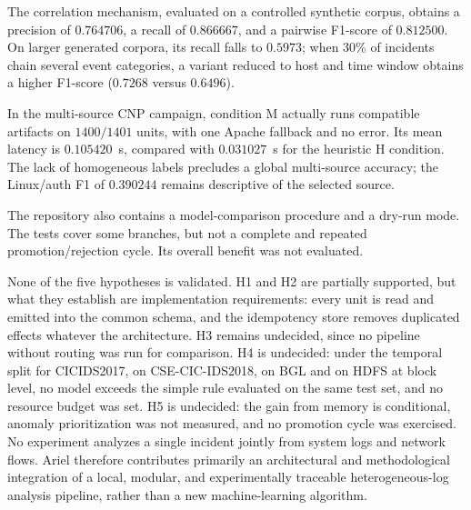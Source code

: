 The correlation mechanism, evaluated on a controlled synthetic corpus,
obtains a precision of $0.764706$, a recall of $0.866667$, and a pairwise
F1-score of $0.812500$. On larger generated corpora, its recall falls to
$0.5973$; when 30\% of incidents chain several event categories, a variant
reduced to host and time window obtains a higher F1-score ($0.7268$ versus
$0.6496$).

In the multi-source CNP campaign, condition M actually runs compatible
artifacts on $1400/1401$ units, with one Apache fallback and no error. Its
mean latency is $0.105420$~s, compared with $0.031027$~s for the heuristic H
condition. The lack of homogeneous labels precludes a global multi-source
accuracy; the Linux/auth F1 of $0.390244$ remains descriptive of the selected
source.

The repository also contains a model-comparison procedure and a dry-run mode.
The tests cover some branches, but not a complete and repeated
promotion/rejection cycle. Its overall benefit was not evaluated.

None of the five hypotheses is validated. H1 and H2 are partially supported,
but what they establish are implementation requirements: every unit is read
and emitted into the common schema, and the idempotency store removes
duplicated effects whatever the architecture. H3 remains undecided, since no
pipeline without routing was run for comparison. H4 is undecided: under the temporal split for CICIDS2017, on CSE-CIC-IDS2018, on BGL and on HDFS at block level, no model exceeds the simple rule evaluated on the same test set, and no resource budget was set. H5 is undecided: the gain from memory is conditional, anomaly prioritization was not measured, and no promotion cycle was exercised. No experiment
analyzes a single incident jointly from system logs and network flows. Ariel \logminer{}
therefore contributes primarily an architectural and methodological
integration of a local, modular, and experimentally traceable
heterogeneous-log analysis pipeline, rather than a new machine-learning
algorithm.
